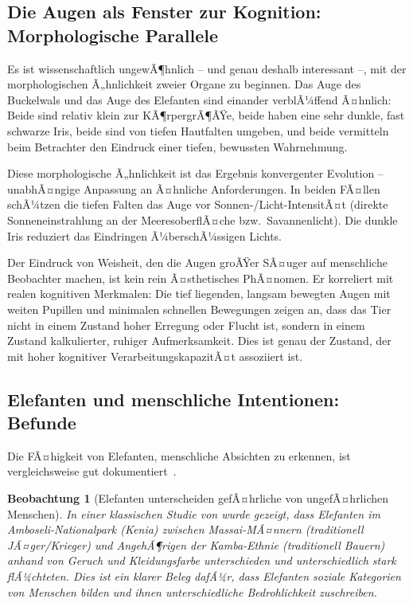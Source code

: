﻿\documentclass[12pt,a4paper]{article}
\newtheorem{beobachtung}{Beobachtung}[section]
\theoremstyle{definition}
\theoremstyle{remark}
\begin{document}
\subsection{Die Augen als Fenster zur Kognition: Morphologische Parallele}

Es ist wissenschaftlich ungewÃ¶hnlich -- und genau deshalb interessant --, mit
der morphologischen Ã„hnlichkeit zweier Organe zu beginnen. Das Auge des
Buckelwals und das Auge des Elefanten sind einander verblÃ¼ffend Ã¤hnlich:
Beide sind relativ klein zur KÃ¶rpergrÃ¶ÃŸe, beide haben eine sehr dunkle,
fast schwarze Iris, beide sind von tiefen Hautfalten umgeben, und beide
vermitteln beim Betrachter den Eindruck einer tiefen, bewussten Wahrnehmung.

Diese morphologische Ã„hnlichkeit ist das Ergebnis konvergenter Evolution --
unabhÃ¤ngige Anpassung an Ã¤hnliche Anforderungen. In beiden FÃ¤llen schÃ¼tzen
die tiefen Falten das Auge vor Sonnen-/Licht-IntensitÃ¤t (direkte Sonneneinstrahlung
an der MeeresoberflÃ¤che bzw.\ Savannenlicht). Die dunkle Iris reduziert das
Eindringen Ã¼berschÃ¼ssigen Lichts.

Der Eindruck von Weisheit, den die Augen groÃŸer SÃ¤uger auf menschliche
Beobachter machen, ist kein rein Ã¤sthetisches PhÃ¤nomen. Er korreliert
mit realen kognitiven Merkmalen: Die tief liegenden, langsam bewegten Augen
mit weiten Pupillen und minimalen schnellen Bewegungen zeigen an, dass das
Tier nicht in einem Zustand hoher Erregung oder Flucht ist, sondern in einem
Zustand kalkulierter, ruhiger Aufmerksamkeit. Dies ist genau der Zustand,
der mit hoher kognitiver VerarbeitungskapazitÃ¤t assoziiert ist.

\subsection{Elefanten und menschliche Intentionen: Befunde}

Die FÃ¤higkeit von Elefanten, menschliche Absichten zu erkennen, ist
vergleichsweise gut dokumentiert~\cite{mccomb2014elephants, bates2007elephants}.

\begin{beobachtung}[Elefanten unterscheiden gefÃ¤hrliche von ungefÃ¤hrlichen Menschen]
  In einer klassischen Studie von \cite{bates2007elephants} wurde gezeigt, dass
  Elefanten im Amboseli-Nationalpark (Kenia) zwischen Massai-MÃ¤nnern (traditionell
  JÃ¤ger/Krieger) und AngehÃ¶rigen der Kamba-Ethnie (traditionell Bauern)
  anhand von Geruch und Kleidungsfarbe unterschieden und unterschiedlich
  stark flÃ¼chteten. Dies ist ein klarer Beleg dafÃ¼r, dass Elefanten
  soziale Kategorien von Menschen bilden und ihnen unterschiedliche
  Bedrohlichkeit zuschreiben.
\end{beobachtung}
\end{document}
